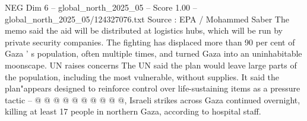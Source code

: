 \begin{textsample}{NEG Dim 6 – global\_north\_2025\_05 – Score 1.00 – global\_north\_2025\_05/124327076.txt}
Source : EPA / Mohammed Saber The memo said the aid will be distributed at logistics hubs, which will be run by private security companies.
The fighting has displaced more than 90 per cent of Gaza ' s population, often multiple times, and turned Gaza into an uninhabitable moonscape.
UN raises concerns The UN said the plan would leave large parts of the population, including the most vulnerable, without supplies.
It said the plan"appears designed to reinforce control over life-sustaining items as a pressure tactic -- @ @ @ @ @ @ @ @ @ @, Israeli strikes across Gaza continued overnight, killing at least 17 people in northern Gaza, according to hospital staff.

\end{textsample}
